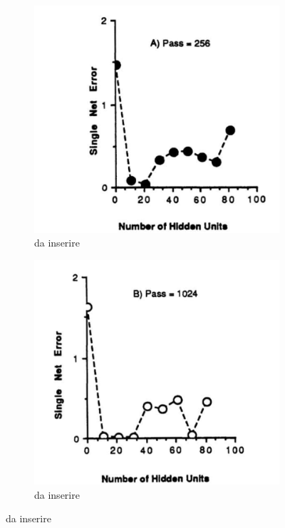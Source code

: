 \documentclass[a4paper,10pt]{article}
\begin{document}
 \begin{figure}[h!]
  \centering
  \begin{subfigure}[b]{0.4\linewidth}
   \includegraphics[width=\linewidth]{NetErrHiddenLa.png}
   \caption{da inserire}
   \label{NetErrHiddLapgn}
  \end{subfigure}
  \begin{subfigure}[b]{0.4\linewidth}
   \includegraphics[width=\linewidth]{NetErrHiddenLb.png}
   \caption{da inserire}
   \label{NetErrHiddLbpgn}
  \end{subfigure}
 \end{figure}
\end{document}
